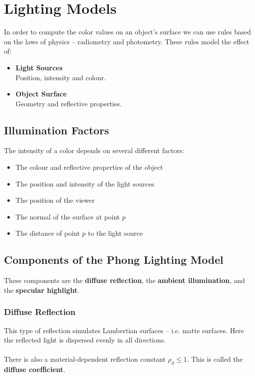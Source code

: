 \documentclass{article}
\begin{document}
\section{Lighting Models}
In order to compute the color values on an object's surface we can use rules based on the laws of physics -- radiometry and photometry. These rules model the effect of:

\begin{itemize}
	\item \textbf{Light Sources}
	\vspace{.2cm} \\
	Position, intensity and colour.
	
	\item \textbf{Object Surface}
	\vspace{.2cm} \\
	Geometry and reflective properties.
\end{itemize}

\subsection{Illumination Factors}
The intensity of a color depends on several different factors:

\begin{itemize}
	\item The colour and reflective properties of the object
	\item The position and intensity of the light sources
	\item The position of the viewer
	\item The normal of the surface at point $p$
	\item The distance of point $p$ to the light source
\end{itemize}

\subsection{Components of the Phong Lighting Model}
These components are the \textbf{diffuse reflection}, the \textbf{ambient illumination}, and the \textbf{specular highlight}.

\subsubsection{Diffuse Reflection}
This type of reflection simulates Lambertian surfaces -- i.e. matte surfaces. Here the reflected light is dispersed evenly in all directions. \\ \\
There is also a material-dependent reflection constant $\rho_d \leq 1$. This is called the \textbf{diffuse coefficient}.
\end{document}
